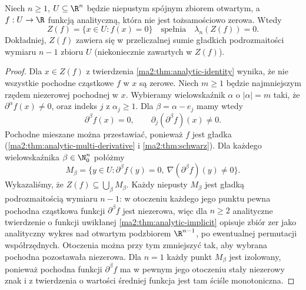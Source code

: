 \begin{twierdzenie}
\label{ma2:thm:analytic-zero-set-null}
Niech $n\ge1$, $U\subseteq\R^n$ będzie niepustym
spójnym zbiorem otwartym, a $f:U\to\R$ funkcją
analityczną, która nie jest tożsamościowo zerowa.
Wtedy
\[
 Z(f)=\{x\in U:f(x)=0\}
 \quad\text{spełnia}\quad \lambda_n(Z(f))=0.
\]
Dokładniej, $Z(f)$ zawiera się w przeliczalnej
sumie gładkich podrozmaitości wymiaru $n-1$
zbioru $U$ (niekoniecznie zawartych w $Z(f)$).
\end{twierdzenie}
\begin{proof}
Dla $x\in Z(f)$ z twierdzenia
\ref{ma2:thm:analytic-identity} wynika, że
nie wszystkie pochodne cząstkowe $f$ w $x$
są zerowe. Niech $m\ge1$ będzie najmniejszym
rzędem niezerowej pochodnej w $x$. Wybieramy
wielowskaźnik $\alpha$ o $|\alpha|=m$ taki,
że $\partial^\alpha f(x)\ne0$, oraz indeks $j$
z $\alpha_j\ge1$. Dla $\beta=\alpha-e_j$
mamy wtedy
\[
 \partial^\beta f(x)=0,\qquad
 \partial_j(\partial^\beta f)(x)\ne0.
\]
Pochodne mieszane można przestawiać,
ponieważ $f$ jest gładka
(\ref{ma2:thm:analytic-multi-derivative}
i \ref{ma2:thm:schwarz}).
Dla każdego wielowskaźnika $\beta\in\N_0^n$
połóżmy
\[
 M_\beta=\{y\in U:\partial^\beta f(y)=0,\
                 \nabla(\partial^\beta f)(y)\ne0\}.
\]
Wykazaliśmy, że $Z(f)\subseteq\bigcup_\beta M_\beta$.
Każdy niepusty $M_\beta$ jest gładką
podrozmaitością wymiaru $n-1$: w otoczeniu
każdego jego punktu pewna pochodna cząstkowa
funkcji $\partial^\beta f$ jest niezerowa,
więc dla $n\ge2$ analityczne twierdzenie
o funkcji uwikłanej
\ref{ma2:thm:analytic-implicit} opisuje
zbiór zer jako analityczny wykres nad otwartym
podzbiorem $\R^{n-1}$, po ewentualnej
permutacji współrzędnych.
Otoczenia można przy tym zmniejszyć tak,
aby wybrana pochodna pozostawała niezerowa.
Dla $n=1$ każdy punkt $M_\beta$ jest izolowany,
ponieważ pochodna funkcji $\partial^\beta f$
ma w pewnym jego otoczeniu stały niezerowy znak
i z twierdzenia o wartości średniej funkcja
jest tam ściśle monotoniczna.


\end{proof}
